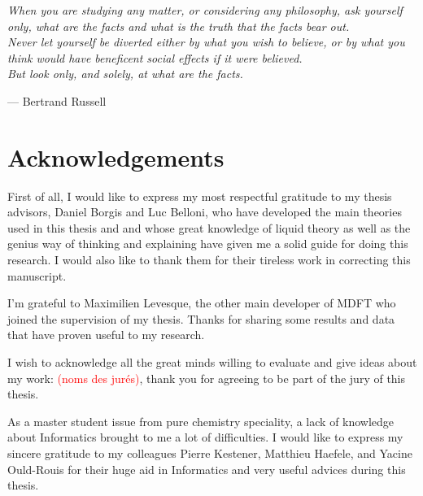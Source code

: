 
\begin{flushright}
\textsl{When you are studying any matter, or considering any philosophy,
ask yourself only, what are the facts and what is the truth that the
facts bear out.}\\
\textsl{ Never let yourself be diverted either by what you wish to
believe, or by what you think would have beneficent social effects
if it were believed.}\\
\textsl{ But look only, and solely, at what are the facts.}
\par\end{flushright}

\begin{flushright}
--- Bertrand Russell 
\par\end{flushright}

\bigskip{}


\begingroup
\let\clearpage\relax
\let\cleardoublepage\relax 


\chapter*{Acknowledgements}

First of all, I would like to express my most respectful gratitude
to my thesis advisors, Daniel Borgis and Luc Belloni, who have developed
the main theories used in this thesis and and whose great knowledge
of liquid theory as well as the genius way of thinking and explaining
have given me a solid guide for doing this research. I would also
like to thank them for their tireless work in correcting this manuscript.

I'm grateful to Maximilien Levesque, the other main developer of MDFT
who joined the supervision of my thesis. Thanks for sharing some results
and data that have proven useful to my research.

I wish to acknowledge all the great minds willing to evaluate and
give ideas about my work: \textcolor{red}{(noms des jurés)}, thank
you for agreeing to be part of the jury of this thesis.

As a master student issue from pure chemistry speciality, a lack of
knowledge about Informatics brought to me a lot of difficulties. I
would like to express my sincere gratitude to my colleagues Pierre
Kestener, Matthieu Haefele, and Yacine Ould-Rouis for their huge aid
in Informatics and very useful advices during this thesis.

